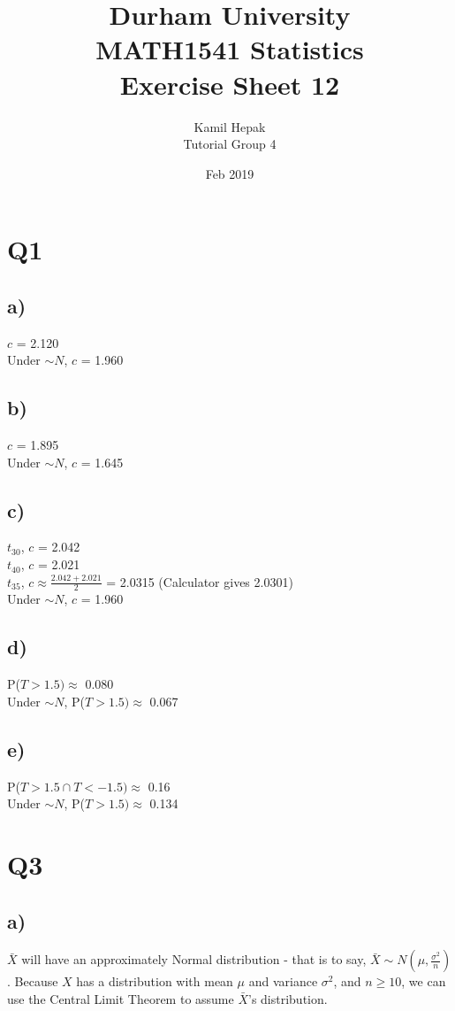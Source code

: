 \documentclass[]{article}
\title{\vspace{-3.0cm}Durham University\\
    MATH1541 Statistics \\
	Exercise Sheet 12}
\author{Kamil Hepak\\
        Tutorial Group 4}
\date{Feb 2019}
\begin{document}
\maketitle

\section{Q1}
\subsection{a)}
$c$ = 2.120
\\
Under $\sim N$, $c$ = 1.960

\subsection{b)}
$c$ = 1.895
\\
Under $\sim N$, $c$ = 1.645

\subsection{c)}
$t_{30}$, $c$ = 2.042 
\\
$t_{40}$, $c$ = 2.021 
\\
$t_{35}$, $c \approx \frac{2.042+2.021}{2}$ = 2.0315 (Calculator gives 2.0301)
\\
Under $\sim N$, $c$ = 1.960

\subsection{d)}
P($T > 1.5) \approx$ 0.080
\\
Under $\sim N$, P($T > 1.5) \approx$ 0.067

\subsection{e)}
P($T > 1.5 \cap T < -1.5) \approx$ 0.16
\\
Under $\sim N$, P($T > 1.5) \approx$ 0.134
\newpage

\section{Q3}

\subsection{a)}
$\bar{X}$ will have an approximately Normal distribution - that is to say, $\bar{X} \sim N(\mu,\frac{\sigma^2}{n})$. Because $X$ has a distribution with mean $\mu$ and variance $\sigma^2$, and $n \geq 10$, we can use the Central Limit Theorem to assume $\bar{X}$'s distribution.
\end{document}
